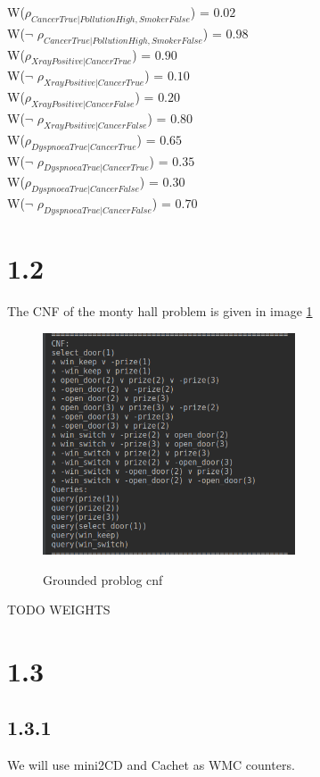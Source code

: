 \documentclass[a4paper,10pt]{report}
\begin{document}
W($\rho_{CancerTrue|PollutionHigh,SmokerFalse}$) = $0.02$\\ 
W($\neg$ $\rho_{CancerTrue|PollutionHigh,SmokerFalse}$) = $0.98$\\ 
W($\rho_{XrayPositive|CancerTrue}$) = $0.90$\\ 
W($\neg$ $\rho_{XrayPositive|CancerTrue}$) = $0.10$\\ 
W($\rho_{XrayPositive|CancerFalse}$) = $0.20$\\ 
W($\neg$ $\rho_{XrayPositive|CancerFalse}$) = $0.80$\\ 
W($\rho_{DyspnoeaTrue|CancerTrue}$) = $0.65$\\ 
W($\neg$ $\rho_{DyspnoeaTrue|CancerTrue}$) = $0.35$\\ 
W($\rho_{DyspnoeaTrue|CancerFalse}$) = $0.30$\\ 
W($\neg$ $\rho_{DyspnoeaTrue|CancerFalse}$) = $0.70$\\ 

\section*{1.2}
The CNF of the monty hall problem is given in image \ref{CNF}
\begin{figure}[h!]
  \includegraphics[width=7.5cm]{GroundProblogCNF.png}
  \label{CNF}
  \caption{Grounded problog cnf}
\end{figure}
TODO WEIGHTS

\section*{1.3}

\subsection*{1.3.1}
We will use mini2CD and Cachet as WMC counters.
\end{document}
